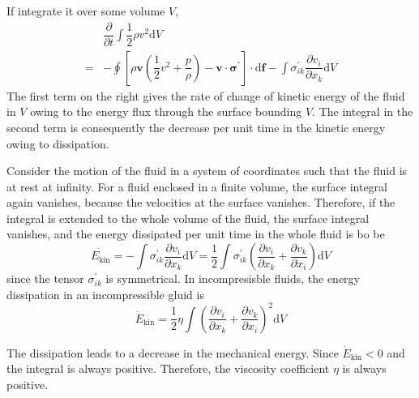 \documentclass[conference]{IEEEtran}
\theoremstyle{definition}
\theoremstyle{remark}
\begin{document}
    If integrate it over some volume $V$,
    \begin{equation}
        \begin{aligned}
            &\dfrac{\partial}{\partial t} \int \dfrac12 \rho v^2 \mathrm{d} V \\
            =&-\oint \left[ \rho \mathbf{v} \left( \dfrac12 v^2 + \dfrac{p}{\rho} \right)  - \mathbf{v} \cdot \boldsymbol{\sigma}^\prime \right] \cdot \mathrm{d} \mathbf{f} - \int \sigma_{ik}^\prime \dfrac{\partial v_i}{\partial x_k} \mathrm{d} V
        \end{aligned}
    \end{equation}
    The first term on the right gives the rate of change of kinetic energy of the fluid in $V$ owing to the energy flux through the surface bounding $V$. The integral in the second term is consequently the decrease per unit time in the kinetic energy owing to dissipation.

    Consider the motion of the fluid in a system of coordinates such that the fluid is at rest at infinity. For a fluid enclosed in a finite volume, the surface integral again vanishes, because the velocities at the surface vanishes. Therefore, if the integral is extended to the whole volume of the fluid, the surface integral vanishes, and the energy dissipated per unit time in the whole fluid is bo be
    \begin{equation}
        \dot{E_{\text{kin}}} = - \int \sigma_{ik}^\prime \dfrac{\partial v_i}{\partial x_k} \mathrm{d} V = \dfrac12 \int \sigma_{ik}^\prime \left( \dfrac{\partial v_i}{\partial x_k} + \dfrac{\partial v_k}{\partial x_i} \right) \mathrm{d} V
    \end{equation}
    since the tensor $\sigma_{ik}^\prime$ is symmetrical. In incompresisble fluids, the energy dissipation in an incompressible gluid is
    \begin{equation}
        \dot{E}_{\mathrm{kin}} = \dfrac12 \eta \int \left( \dfrac{\partial v_i}{\partial x_k} + \dfrac{\partial v_k}{\partial x_i} \right)^2 \mathrm{d} V
    \end{equation}
    
    The dissipation leads to a decrease in the mechanical energy. Since $\dot{E}_{\mathrm{kin}} < 0$ and the integral is always positive. Therefore, the viscosity coefficient $\eta$ is always positive.
\end{document}
